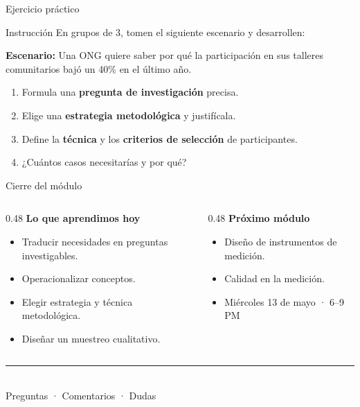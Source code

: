 \documentclass[aspectratio=169, 12pt]{beamer}
\begin{document}
\begin{frame}{Ejercicio práctico}
  \begin{block}{Instrucción}
    En grupos de 3, tomen el siguiente escenario y desarrollen:
  \end{block}
  \vspace{0.3cm}
  \textbf{Escenario:} Una ONG quiere saber por qué la participación en sus talleres comunitarios bajó un 40\% en el último año.
  \vspace{0.3cm}
  \begin{enumerate}
    \item Formula una \textbf{pregunta de investigación} precisa.
    \item Elige una \textbf{estrategia metodológica} y justifícala.
    \item Define la \textbf{técnica} y los \textbf{criterios de selección} de participantes.
    \item ¿Cuántos casos necesitarías y por qué?
  \end{enumerate}
\end{frame}

\begin{frame}{Cierre del módulo}
  \begin{columns}[T]
    \begin{column}{0.48\textwidth}
      \textbf{\color{daMagenta}Lo que aprendimos hoy}
      \begin{itemize}
        \small
        \item Traducir necesidades en preguntas investigables.
        \item Operacionalizar conceptos.
        \item Elegir estrategia y técnica metodológica.
        \item Diseñar un muestreo cualitativo.
      \end{itemize}
    \end{column}
    \begin{column}{0.48\textwidth}
      \textbf{\color{daPurpleLight}Próximo módulo}
      \begin{itemize}
        \small
        \item Diseño de instrumentos de medición.
        \item Calidad en la medición.
        \item Miércoles 13 de mayo · 6--9 PM
      \end{itemize}
    \end{column}
  \end{columns}
  \vspace{0.5cm}
  \begin{center}
    {\color{daMagenta}\rule{6cm}{0.8pt}}\\[0.3cm]
    {\small\color{daLightBg!70!black} Preguntas · Comentarios · Dudas}
  \end{center}
\end{frame}
\end{document}
